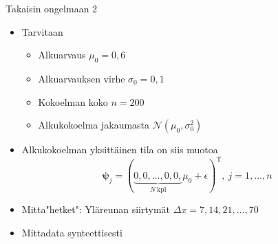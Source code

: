 \documentclass{beamer}
\begin{document}
\begin{frame}{Takaisin ongelmaan 2}

\begin{itemize}
\item Tarvitaan
\begin{itemize}
\item Alkuarvaus $\mu_0=0{,}6$
\item Alkuarvauksen virhe $\sigma_0 = 0{,}1$
\item Kokoelman koko $n=200$
\item Alkukokoelma jakaumasta $\mathcal{N}(\mu_0,\sigma_0^2)$
\end{itemize}
\item Alkukokoelman yksittäinen tila on siis muotoa
\[
\boldsymbol{\psi}_j = (\underbrace{0, 0, \dots, 0, 0,}_{N~\text{kpl}} \mu_0 + \epsilon )^\mathrm{T},~j=1,\dots,n
\]
\item Mitta"hetket": Yläreunan siirtymät $\Delta x = 7,14,21,\dots,70$
\item Mittadata synteettisesti
\end{itemize}


\end{frame}
\end{document}
